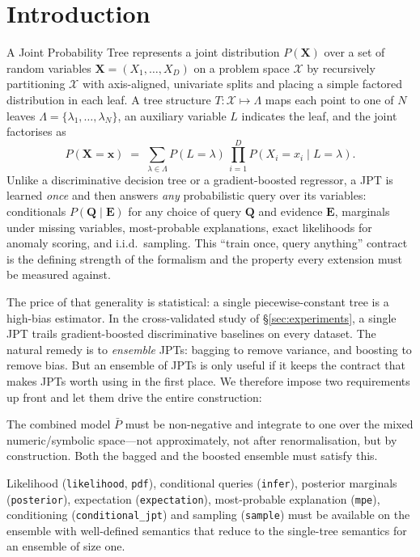 \documentclass[11pt]{article}
\theoremstyle{plain}
\theoremstyle{definition}
\theoremstyle{remark}
\newcommand{\Xsp}{\mathcal{X}}
\newcommand{\Leafset}{\Lambda}
\begin{document}
\section{Introduction}
\label{sec:intro}

A Joint Probability Tree \citep{nyga2023jpt} represents a joint
distribution $P(\mathbf{X})$ over a set of random variables
$\mathbf{X}=(X_1,\dots,X_D)$ on a problem space $\Xsp$ by recursively
partitioning $\Xsp$ with axis-aligned, univariate splits and placing a
simple factored distribution in each leaf. A tree structure
$T:\Xsp\mapsto\Leafset$ maps each point to one of $N$ leaves
$\Leafset=\{\lambda_1,\dots,\lambda_N\}$, an auxiliary variable $L$
indicates the leaf, and the joint factorises as
\begin{equation}
\label{eq:jpt-intro}
P(\mathbf{X}=\mathbf{x})
\;=\;\sum_{\lambda\in\Leafset} P(L=\lambda)\,
\prod_{i=1}^{D} P\!\left(X_i=x_i \mid L=\lambda\right).
\end{equation}
Unlike a discriminative decision tree or a gradient-boosted regressor, a
JPT is learned \emph{once} and then answers \emph{any} probabilistic query
over its variables: conditionals $P(\mathbf{Q}\mid\mathbf{E})$ for any
choice of query $\mathbf{Q}$ and evidence $\mathbf{E}$, marginals under
missing variables, most-probable explanations, exact likelihoods for
anomaly scoring, and i.i.d.\ sampling. This ``train once, query anything''
contract is the defining strength of the formalism and the property every
extension must be measured against.

The price of that generality is statistical: a single piecewise-constant
tree is a high-bias estimator. In the cross-validated study of
\S\ref{sec:experiments}, a single JPT trails gradient-boosted
discriminative baselines on every dataset. The natural remedy is to
\emph{ensemble} JPTs:
bagging \citep{breiman1996bagging,breiman2001rf} to remove variance, and
boosting to remove bias. But an ensemble of JPTs is only useful if it
keeps the contract that makes JPTs worth using in the first place. We
therefore impose two requirements up front and let them drive the entire
construction:

\begin{description}[leftmargin=1.6em,style=nextline]
\item[(R1) The ensemble is a valid joint density.] The combined model
$\bar P$ must be non-negative and integrate to one over the mixed
numeric/symbolic space---not approximately, not after renormalisation,
but by construction. Both the bagged and the boosted ensemble must
satisfy this.
\item[(R2) Every inference algorithm translates.] Likelihood
(\texttt{likelihood}, \texttt{pdf}), conditional queries
(\texttt{infer}), posterior marginals (\texttt{posterior}), expectation
(\texttt{expectation}), most-probable explanation (\texttt{mpe}),
conditioning (\texttt{conditional\_jpt}) and sampling (\texttt{sample})
must be available on the ensemble with well-defined semantics that reduce
to the single-tree semantics for an ensemble of size one.
\end{description}
\end{document}
